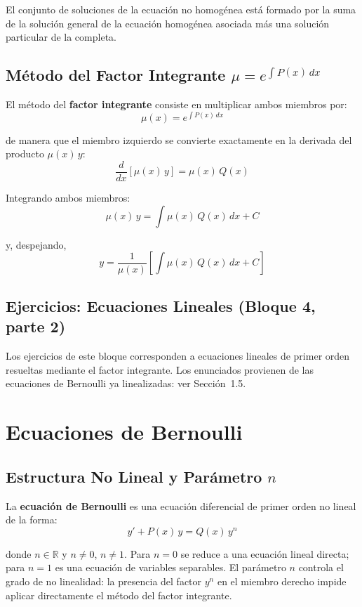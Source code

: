 \documentclass[12pt,letterpaper]{report}
\numberwithin{equation}{chapter}
\numberwithin{figure}{chapter}
\numberwithin{table}{chapter}
\begin{document}
El conjunto de soluciones de la ecuación no homogénea está formado por la suma de la solución general de la ecuación homogénea asociada más una solución particular de la completa.

\subsection{Método del Factor Integrante $\mu = e^{\int P(x)\,dx}$}

El método del \textbf{factor integrante} consiste en multiplicar ambos miembros por:
\[
\mu(x) = e^{\int P(x)\,dx}
\]

de manera que el miembro izquierdo se convierte exactamente en la derivada del producto $\mu(x)\,y$:
\[
\dfrac{d}{dx}\!\left[\mu(x)\,y\right] = \mu(x)\,Q(x)
\]

Integrando ambos miembros:
\[
\mu(x)\,y = \int \mu(x)\,Q(x)\,dx + C
\]

y, despejando,
\[
y = \dfrac{1}{\mu(x)}\left[\int \mu(x)\,Q(x)\,dx + C\right]
\]

\subsection{Ejercicios: Ecuaciones Lineales (Bloque 4, parte 2)}

Los ejercicios de este bloque corresponden a ecuaciones lineales de primer orden resueltas mediante el factor integrante. Los enunciados provienen de las ecuaciones de Bernoulli ya linealizadas: ver Sección~1.5.


\section{Ecuaciones de Bernoulli}

\subsection{Estructura No Lineal y Parámetro $n$}

La \textbf{ecuación de Bernoulli} es una ecuación diferencial de primer orden no lineal de la forma:
\begin{equation*}
y' + P(x)\,y = Q(x)\,y^{n}
\end{equation*}

donde $n \in \mathbb{R}$ y $n \neq 0$, $n \neq 1$. Para $n = 0$ se reduce a una ecuación lineal directa; para $n = 1$ es una ecuación de variables separables. El parámetro $n$ controla el grado de no linealidad: la presencia del factor $y^n$ en el miembro derecho impide aplicar directamente el método del factor integrante.
\end{document}
